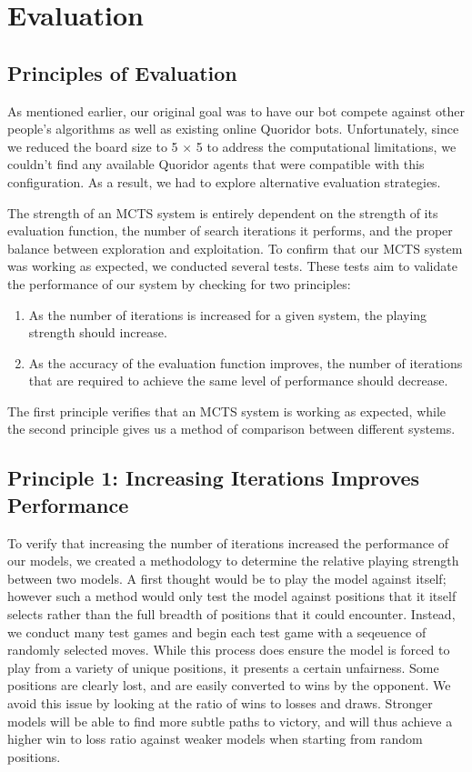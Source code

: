 \documentclass[10pt]{article}
\begin{document}
\section{Evaluation}

\subsection{Principles of Evaluation}

As mentioned earlier, our original goal was to have our bot compete against other people's algorithms as well as existing online Quoridor bots. Unfortunately, since we reduced the board size to 5 × 5 to address the computational limitations, we couldn't find any available Quoridor agents that were compatible with this configuration. As a result, we had to explore alternative evaluation strategies.

The strength of an MCTS system is entirely dependent on the strength of its evaluation function, the number of search iterations it performs, and the proper balance between exploration and exploitation. To confirm that our MCTS system was working as expected, we conducted several tests. These tests aim to validate the performance of our system by checking for two principles:

\begin{enumerate}
    \item As the number of iterations is increased for a given system, the playing strength should increase.
    \item As the accuracy of the evaluation function improves, the number of iterations that are required to achieve the same level of performance should decrease.
\end{enumerate}

The first principle verifies that an MCTS system is working as expected, while the second principle gives us a method of comparison between different systems.

\subsection{Principle 1: Increasing Iterations Improves Performance}
\label{sec:moreitersisbetter}

To verify that increasing the number of iterations increased the performance of our models, we created a methodology to determine the relative playing strength between two models. A first thought would be to play the model against itself; however such a method would only test the model against positions that it itself selects rather than the full breadth of positions that it could encounter. Instead, we conduct many test games and begin each test game with a seqeuence of randomly selected moves. While this process does ensure the model is forced to play from a variety of unique positions, it presents a certain unfairness. Some positions are clearly lost, and are easily converted to wins by the opponent. We avoid this issue by looking at the ratio of wins to losses and draws. Stronger models will be able to find more subtle paths to victory, and will thus achieve a higher win to loss ratio against weaker models when starting from random positions.
\end{document}
